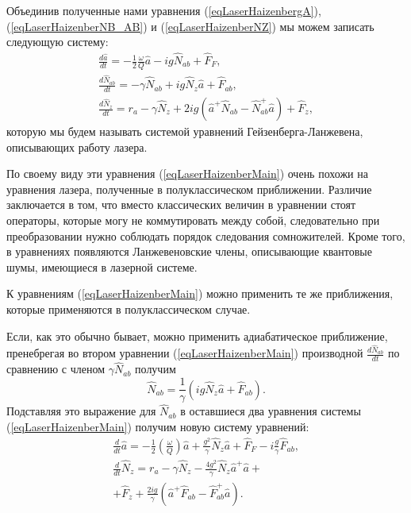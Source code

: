 Объединив полученные нами уравнения (\ref{eqLaserHaizenbergA}), 
(\ref{eqLaserHaizenberNB_AB}) и
(\ref{eqLaserHaizenberNZ}) мы можем записать следующую 
систему:
\begin{eqnarray}
\frac{d \hat{a}}{d t} = 
- \frac{1}{2}\frac{\omega}{Q}\hat{a}
-i g \hat{N}_{ab} + 
\hat{F}_F,
\nonumber \\
\frac{d \hat{N}_{ab}}{d t} = 
- \gamma \hat{N}_{ab} 
+ i g \hat{N}_{z} \hat{a} 
 + \hat{F}_{ab},
\nonumber \\
\frac{d \hat{N}_z}{d t} = r_a
- \gamma \hat{N}_{z} +
2 i g 
 \left(
\hat{a}^{+}\hat{N}_{ab} -
\hat{N}_{ab}^{+}\hat{a}
\right) + \hat{F}_{z},
\label{eqLaserHaizenberMain}
\end{eqnarray}
которую мы будем называть системой уравнений Гейзенберга-Ланжевена,
описывающих работу лазера.

По своему виду эти уравнения (\ref{eqLaserHaizenberMain}) очень похожи
на уравнения лазера, полученные в полуклассическом
приближении. Различие заключается в том, 
что вместо классических величин в уравнении стоят операторы, которые
могу не коммутировать между собой, следовательно при преобразовании
нужно соблюдать порядок следования сомножителей. Кроме того, в
уравнениях появляются Ланжевеновские члены, описывающие квантовые
шумы, имеющиеся в лазерной системе.

К уравнениям (\ref{eqLaserHaizenberMain})
можно применить те же приближения, которые применяются в
полуклассическом случае.

Если, как это обычно бывает, 
можно применить адиабатическое приближение,
пренебрегая во втором уравнении (\ref{eqLaserHaizenberMain}) производной
$\frac{d\hat{N}_{ab}}{d t}$ по сравнению с членом $\gamma
\hat{N}_{ab}$ получим
\begin{equation}
\hat{N}_{ab} = \frac{1}{\gamma} \left(i g \hat{N}_z\hat{a} +
\hat{F}_{ab}\right).
\nonumber
\end{equation}
Подставляя это выражение для $\hat{N}_{ab}$ в оставшиеся два уравнения
системы (\ref{eqLaserHaizenberMain}) получим новую
систему уравнений:
\begin{eqnarray}
\frac{d}{dt} \hat{a} = -
\frac{1}{2}\left(\frac{\omega}{Q}\right)\hat{a} + \frac{g^2}{\gamma}
\hat{N}_z\hat{a} + \hat{F}_F - i\frac{g}{\gamma}\hat{F}_{ab},
\nonumber \\
\frac{d}{dt}\hat{N}_z = r_a -
\gamma\hat{N}_z - \frac{4g^2}{\gamma}
\hat{N}_z\hat{a}^{+}\hat{a} +
\nonumber \\
+ \hat{F}_z + \frac{2ig}{\gamma} \left(\hat{a}^{+}\hat{F}_{ab} -
\hat{F}_{ab}^{+}\hat{a}\right).
\label{eqLaserHaizenberg16add}
\end{eqnarray}


